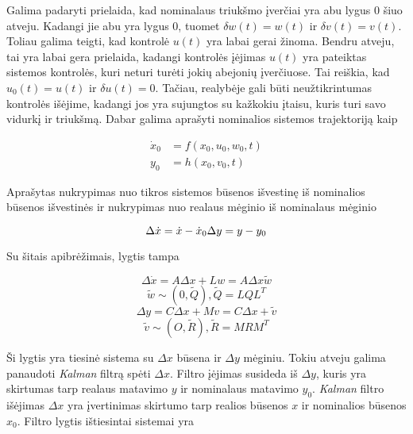     Galima padaryti prielaida, kad nominalaus triukšmo įverčiai yra abu lygus 0 šiuo atveju.
    Kadangi jie abu yra lygus 0, tuomet $\delta w(t) = w(t)$ ir $\delta v(t) = v(t)$.
    Toliau galima teigti, kad kontrolė $u(t)$ yra labai gerai žinoma.
    Bendru atveju, tai yra labai gera prielaida, kadangi kontrolės įėjimas $u(t)$ yra pateiktas sistemos kontrolės, kuri neturi turėti jokių abejonių įverčiuose.
    Tai reiškia, kad $u_0(t) = u(t)$ ir $\delta u(t) = 0$.
    Tačiau, realybėje gali būti neužtikrintumas kontrolės išėjime, kadangi jos yra sujungtos su kažkokiu įtaisu, kuris turi savo vidurkį ir triukšmą.
    Dabar galima aprašyti nominalios sistemos trajektoriją kaip

    \begin{equation}
        \label{eq:nominal_sistem_trajektory}
        \begin{aligned}
            \dot{x}_0 &= f(x_0, u_0, w_0, t) \\
            y_0 &= h(x_0, v_0, t)
        \end{aligned}
    \end{equation}

    Aprašytas nukrypimas nuo tikros sistemos būsenos išvestinę iš nominalios būsenos išvestinės ir nukrypimas nuo realaus mėginio iš nominalaus mėginio

    \begin{equation}
        \Delta \dot{x} = \dot{x} - \dot{x}_0 \\
        \Delta y = y - y_0
    \end{equation}

    Su šitais apibrėžimais, lygtis tampa

    \begin{equation}
        \Delta \dot{x} = A \Delta x + Lw = A \Delta x \tilde{w}
    \end{equation}
    \begin{equation}
        \tilde{w} \sim (0, \tilde{Q}), \tilde{Q} = LQL^T
    \end{equation}
    \begin{equation}
        \Delta y = C \Delta x + Mv = C \Delta x + \tilde{v}
    \end{equation}
    \begin{equation}
        \tilde{v} \sim (O, \tilde{R}), \tilde{R} = MRM^T
    \end{equation}

    Ši lygtis yra tiesinė sistema su $\Delta x$ būsena ir $\Delta y$ mėginiu.
    Tokiu atveju galima panaudoti \textit{Kalman} filtrą spėti $\Delta x$.
    Filtro įėjimas susideda iš $\Delta y$, kuris yra skirtumas tarp realaus matavimo $y$ ir nominalaus matavimo $y_0$.
    \textit{Kalman} filtro išėjimas $\Delta x$ yra įvertinimas skirtumo tarp realios būsenos $x$ ir nominalios būsenos $x_0$.
    Filtro lygtis ištiesintai sistemai yra

